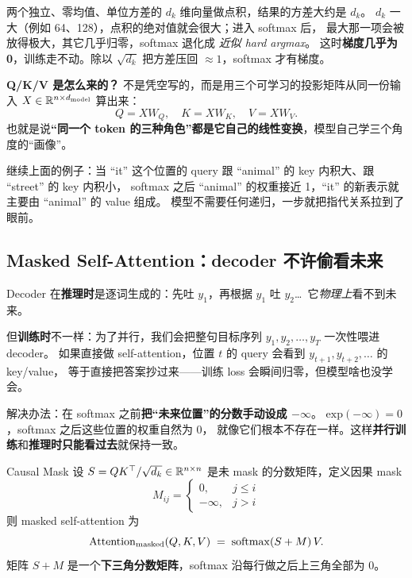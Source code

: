 \begin{remark}
两个独立、零均值、单位方差的 $d_k$ 维向量做点积，结果的方差大约是 $d_k$。
$d_k$ 一大（例如 64、128），点积的绝对值就会很大；进入 softmax 后，
最大那一项会被放得极大，其它几乎归零，softmax 退化成 \emph{近似 hard argmax}。
这时\textbf{梯度几乎为 0}，训练走不动。除以 $\sqrt{d_k}$ 把方差压回 $\approx 1$，softmax 才有梯度。
\end{remark}

\begin{engbox}
\textbf{Q/K/V 是怎么来的？} 不是凭空写的，而是用三个可学习的投影矩阵从同一份输入 $X \in \mathbb{R}^{n \times d_{\text{model}}}$ 算出来：
\[
  Q = X W_Q,\quad K = X W_K,\quad V = X W_V .
\]
也就是说\textbf{“同一个 token 的三种角色”都是它自己的线性变换}，模型自己学三个角度的“画像”。
\end{engbox}

\begin{example}[“it” 该指谁]
继续上面的例子：当 ``it'' 这个位置的 query 跟 ``animal'' 的 key 内积大、跟 ``street'' 的 key 内积小，
softmax 之后 ``animal'' 的权重接近 1，``it'' 的新表示就主要由 ``animal'' 的 value 组成。
模型不需要任何递归，一步就把指代关系拉到了眼前。
\end{example}

\subsection{Masked Self-Attention：decoder 不许偷看未来}
\label{subsec:ch03-masked}

\begin{problemblock}
Decoder 在\textbf{推理时}是逐词生成的：先吐 $y_1$，再根据 $y_1$ 吐 $y_2$\ldots\ 它\emph{物理上}看不到未来。

但\textbf{训练时}不一样：为了并行，我们会把整句目标序列 $y_1, y_2, \dots, y_T$ 一次性喂进 decoder。
如果直接做 self-attention，位置 $t$ 的 query 会看到 $y_{t+1}, y_{t+2}, \dots$ 的 key/value，
等于直接把答案抄过来——训练 loss 会瞬间归零，但模型啥也没学会。
\end{problemblock}

\begin{intuitionblock}
解决办法：在 softmax 之前\textbf{把“未来位置”的分数手动设成 $-\infty$}。
$\mathrm{exp}(-\infty) = 0$，softmax 之后这些位置的权重自然为 0，
就像它们根本不存在一样。这样\textbf{并行训练}和\textbf{推理时只能看过去}就保持一致。
\end{intuitionblock}

\begin{mathbox}{Causal Mask}
设 $S = QK^\top / \sqrt{d_k} \in \mathbb{R}^{n \times n}$ 是未 mask 的分数矩阵，定义因果 mask
\[
  M_{ij} =
  \begin{cases}
    0,        & j \le i \\
    -\infty,  & j > i
  \end{cases}
\]
则 masked self-attention 为
\[
  \mathrm{Attention}_{\text{masked}}(Q,K,V)
  \;=\; \mathrm{softmax}(S + M)\, V .
\]
矩阵 $S + M$ 是一个\textbf{下三角分数矩阵}，softmax 沿每行做之后上三角全部为 0。
\end{mathbox}

